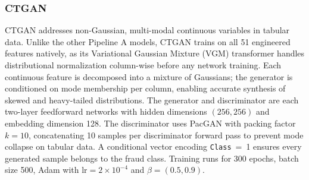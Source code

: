 \documentclass[conference]{IEEEtran}
\begin{document}
\subsubsection{CTGAN}

CTGAN addresses non-Gaussian, multi-modal continuous variables in tabular
data. Unlike the other Pipeline A models, CTGAN trains on all 51 engineered
features natively, as its Variational Gaussian Mixture (VGM) transformer
handles distributional normalization column-wise before any network training.
Each continuous feature is decomposed into a mixture of Gaussians; the
generator is conditioned on mode membership per column, enabling accurate
synthesis of skewed and heavy-tailed distributions. The generator and
discriminator are each two-layer feedforward networks with hidden dimensions
$(256, 256)$ and embedding dimension 128. The discriminator uses PacGAN with
packing factor $k=10$, concatenating 10 samples per discriminator forward
pass to prevent mode collapse on tabular data. A conditional vector encoding
\texttt{Class}~=~1 ensures every generated sample belongs to the fraud class.
Training runs for 300 epochs, batch size 500, Adam with
$\text{lr}=2\times10^{-4}$ and $\beta=(0.5, 0.9)$.
\end{document}
